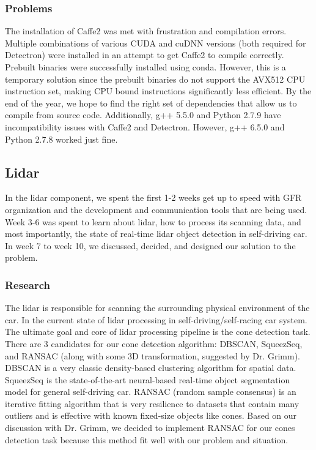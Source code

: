 \documentclass[10pt, onecolumn, draftclsnofoot, letterpaper,compsoc]{IEEEtran}
\begin{document}
\subsubsection{Problems}
The installation of Caffe2 was met with frustration and compilation errors. Multiple combinations of various CUDA and cuDNN versions (both required for Detectron) were installed in an attempt to get Caffe2 to compile correctly. Prebuilt binaries were successfully installed using conda. However, this is a temporary solution since the prebuilt binaries do not support the AVX512 CPU instruction set, making CPU bound instructions significantly less efficient. By the end of the year, we hope to find the right set of dependencies that allow us to compile from source code. Additionally, g++ 5.5.0 and Python 2.7.9 have incompatibility issues with Caffe2 and Detectron. However, g++ 6.5.0 and Python 2.7.8 worked just fine. 

\subsection{Lidar}

In the lidar component, we spent the first 1-2 weeks get up to speed with GFR organization and the development and communication tools that are being used. Week 3-6 was spent to learn about lidar, how to process its scanning data, and most importantly, the state of real-time lidar object detection in self-driving car. In week 7 to week 10, we discussed, decided, and designed our solution to the problem.

\subsubsection{Research}

The lidar is responsible for scanning the surrounding physical environment of the car. In the current state of lidar processing in self-driving/self-racing car system. The ultimate goal and core of lidar processing pipeline is the cone detection task. There are 3 candidates for our cone detection algorithm: DBSCAN, SqueezSeq, and RANSAC (along with some 3D transformation, suggested by Dr. Grimm). DBSCAN is a very classic density-based clustering algorithm for spatial data. SqueezSeq is the state-of-the-art neural-based real-time object segmentation model for general self-driving car. RANSAC (random sample consensus) is an iterative fitting algorithm that is very resilience to datasets that contain many outliers and is effective with known fixed-size objects like cones. Based on our discussion with Dr. Grimm, we decided to implement RANSAC for our cones detection task because this method fit well with our problem and situation.
\end{document}
